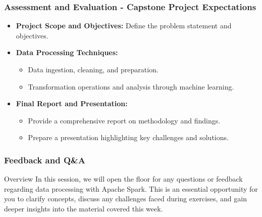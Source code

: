 \documentclass[aspectratio=169]{beamer}
\begin{document}
\begin{frame}[fragile]
    \frametitle{Assessment and Evaluation - Capstone Project Expectations}
    \begin{itemize}
        \item \textbf{Project Scope and Objectives:} Define the problem statement and objectives.
        \item \textbf{Data Processing Techniques:} 
            \begin{itemize}
                \item Data ingestion, cleaning, and preparation.
                \item Transformation operations and analysis through machine learning.
            \end{itemize}
        \item \textbf{Final Report and Presentation:} 
            \begin{itemize}
                \item Provide a comprehensive report on methodology and findings.
                \item Prepare a presentation highlighting key challenges and solutions.
            \end{itemize}
    \end{itemize}
\end{frame}

\begin{frame}[fragile]
  \frametitle{Feedback and Q\&A}
  \begin{block}{Overview}
    In this session, we will open the floor for any questions or feedback regarding data processing with Apache Spark. 
    This is an essential opportunity for you to clarify concepts, discuss any challenges faced during exercises, 
    and gain deeper insights into the material covered this week.
  \end{block}
\end{frame}
\end{document}
